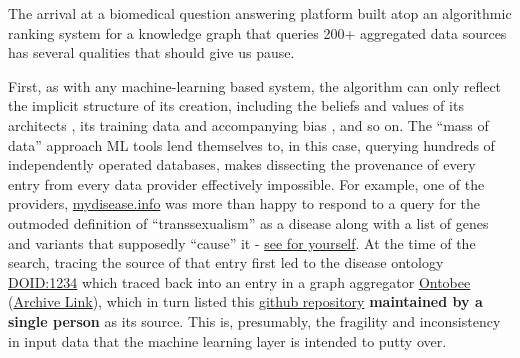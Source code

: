 The arrival at a biomedical question answering platform built atop an
algorithmic ranking system for a knowledge graph that queries 200+
aggregated data sources has several qualities that should give us pause.

First, as with any machine-learning based system, the algorithm can only reflect the implicit structure of its creation, including the beliefs and values of its architects \citep{ birhaneValuesEncodedMachine2022, birhaneAlgorithmicInjusticeRelational2021}, its training data and accompanying bias \citep{birhaneMultimodalDatasetsMisogyny2021}, and so on. The ``mass
of data'' approach ML tools lend themselves to, in this case, querying
hundreds of independently operated databases, makes dissecting the
provenance of every entry from every data provider effectively
impossible. For example, one of the providers,
\href{https://mydisease.info}{mydisease.info} was more than happy to
respond to a query for the outmoded definition of ``transsexualism'' as
a disease \citep{ramTransphobiaEncodedExamination2021}  along with
a list of genes and variants that supposedly ``cause'' it -
\href{http://mydisease.info/v1/query?q=\%22DOID\%3A10919\%22}{see for
yourself}. At the time of the search, tracing the source of that entry
first led to the disease ontology
\href{https://web.archive.org/web/20211007053446/https://www.ebi.ac.uk/ols/ontologies/doid/terms?iri=http\%3A\%2F\%2Fpurl.obolibrary.org\%2Fobo\%2FDOID_1234}{DOID:1234}
which traced back into an entry in a graph aggregator
\href{http://www.ontobee.org/ontology/DOID?iri=http://purl.obolibrary.org/obo/DOID_1234}{Ontobee}
(\href{https://web.archive.org/web/20210923110103/http://www.ontobee.org/ontology/DOID?iri=http://purl.obolibrary.org/obo/DOID_1234}{Archive
Link}), which in turn listed this
\href{https://github.com/jannahastings/mental-functioning-ontology}{github
repository} \textbf{maintained by a single person} as its
source. This is, presumably, the fragility
and inconsistency in input data that the machine learning layer is
intended to putty over.

